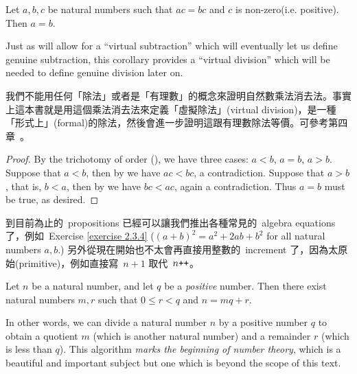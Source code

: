 \begin{corollary} \label{corollary 2.3.7}
Let \(a, b, c\) be natural numbers such that \(ac = bc\) and \(c\) is non-zero(i.e. positive). Then \(a = b\).
\end{corollary}

\begin{remark} \label{remark 2.3.8}
Just as  will allow for a “virtual subtraction” which will eventually let us define genuine subtraction, this corollary provides a “virtual division” which will be needed to define genuine division later on.
\end{remark}
\begin{note}
我們不能用任何「除法」或者是「有理數」的概念來證明自然數乘法消去法。事實上這本書就是用這個乘法消去法來定義「虛擬除法」(virtual division)，是一種「形式上」(formal)的除法，然後會進一步證明這跟有理數除法等價。可參考第四章\ 。
\end{note}
\begin{proof}
By the trichotomy of order (), we have three cases: \(a < b\), \(a = b\), \(a > b\). Suppose that \(a < b\), then by  we have \(ac < bc\), a contradiction. Suppose that \(a > b\), that is, \(b < a\), then by  we have \(bc < ac\), again a contradiction. Thus \(a = b\) must be true, as desired.
\end{proof}

\begin{note}
到目前為止的\ propositions 已經可以讓我們推出各種常見的\ algebra equations 了，例如\ Exercise \ref{exercise 2.3.4} (\((a + b)^2 = a^2 +2ab + b^2\) for all natural numbers \(a, b\).) 另外從現在開始也不太會再直接用整數的\ increment 了，因為太原始(primitive)，例如直接寫\ \(n + 1\) 取代\ \(n\texttt{++}\)。
\end{note}

\begin{proposition} \label{prop 2.3.9}
Let \(n\) be a natural number, and let \(q\) be a \emph{positive} number. Then there exist natural numbers \(m, r\) such that \(0 \leq r < q\) and \(n = mq + r\).
\end{proposition}

\begin{remark} \label{remark 2.3.10}
In other words, we can divide a natural number \(n\) by a positive number \(q\) to obtain a quotient \(m\) (which is another natural number) and a remainder \(r\) (which is less than \(q\)). This algorithm \emph{marks the beginning of number theory}, which is a beautiful and important subject but one which is beyond the scope of this text.
\end{remark}

